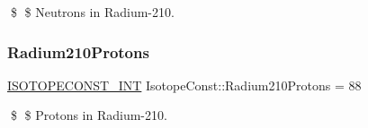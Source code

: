 \$ \$ Neutrons in Radium-\/210. \mbox{\label{group___isotope_const-_radium-_ra210_gaff089b018f84612784e62253a98c7636}} 
\subsubsection{\texorpdfstring{Radium210\+Protons}{Radium210Protons}}
{\footnotesize\ttfamily \mbox{\hyperlink{group___isotope_const-_macros_ga5f18360b3e99483a35c32d789e62621c}{I\+S\+O\+T\+O\+P\+E\+C\+O\+N\+S\+T\+\_\+\+I\+NT}} Isotope\+Const\+::\+Radium210\+Protons = 88}

\$ \$ Protons in Radium-\/210. 
